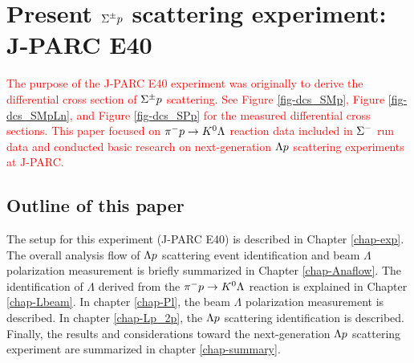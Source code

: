 \clearpage
\section{Present $\Sigma^{\pm}p$ scattering experiment: \\J-PARC E40}
\textcolor{red}{The purpose of the J-PARC E40 experiment was originally to derive the differential cross section of $\Sigma^{\pm}p$ scattering. See Figure \ref{fig-dcs_SMp}, Figure \ref{fig-dcs_SMpLn}, and Figure \ref{fig-dcs_SPp} for the measured differential cross sections. This paper focused on $\pi^- p \to K^0 \Lambda$ reaction data included in $\Sigma^{-}$ run data and conducted basic research on next-generation $\Lambda p$ scattering experiments at J-PARC.}

\subsection{Outline of this paper}
The setup for this experiment (J-PARC E40) is described in Chapter \ref{chap-exp}. The overall analysis flow of $\Lambda p$ scattering event identification and beam $\Lambda$ polarization measurement is briefly summarized in Chapter \ref{chap-Anaflow}. The identification of $\Lambda$ derived from the $\pi^- p \to K^0 \Lambda$ reaction is explained in Chapter \ref{chap-Lbeam}. In chapter \ref{chap-Pl}, the beam $\Lambda$ polarization measurement is described. In chapter \ref{chap-Lp_2p}, the $\Lambda p$ scattering identification is described. Finally, the results and considerations toward the next-generation $\Lambda p$ scattering experiment are summarized in chapter \ref{chap-summary}.


